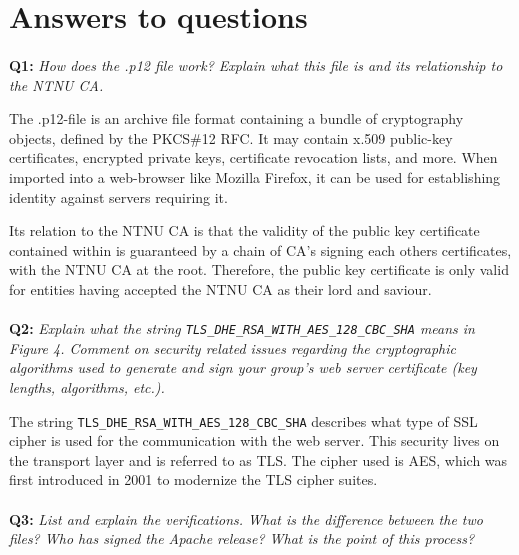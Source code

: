 \section{Answers to questions}

\paragraph{}
\textbf{Q1:}
\textit{How does the .p12 file work? Explain what this file is and its relationship to the NTNU CA.}

The .p12-file is an archive file format containing a bundle of cryptography objects, defined by the PKCS\#12 RFC\cite{pkcs-12}.
It may contain x.509 public-key certificates\cite{x509}, encrypted private keys, certificate revocation lists, and more.
When imported into a web-browser like Mozilla Firefox, it can be used for establishing identity against servers requiring it.

Its relation to the NTNU CA is that the validity of the public key certificate contained within is guaranteed by a chain of CA's signing each others certificates, with the NTNU CA at the root.
Therefore, the public key certificate is only valid for entities having accepted the NTNU CA as their lord and saviour.

\paragraph{}
\textbf{Q2:}
\cprotect\textit{Explain what the string \verb/TLS_DHE_RSA_WITH_AES_128_CBC_SHA/ means in Figure 4. Comment on security related issues regarding the cryptographic algorithms used to generate and sign your group's web server certificate (key lengths, algorithms, etc.).}

The string \verb/TLS_DHE_RSA_WITH_AES_128_CBC_SHA/ describes what type of SSL cipher is used for the communication with the web server.
This security lives on the transport layer and is referred to as TLS.
The cipher used is AES, which was first introduced in 2001\cite{rfc3268} to modernize the TLS cipher suites.



\paragraph{}
\textbf{Q3:}
\textit{List and explain the verifications. What is the difference between the two files? Who has signed the Apache release? What is the point of this process?}

